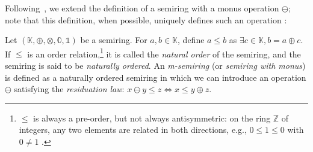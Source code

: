 Following~\cite{geerts2010database}, we extend the definition of a semiring with a monus operation $\ominus$;
note that this definition, when possible, uniquely defines such an
operation :
\begin{definition} \label{def:m-semiring}
  Let $(\mathbb K, \oplus, \otimes, \mathbb 0, \mathbb 1)$ be a semiring.
  For $a, b\in\mathbb K$, define
$a\le b$ as $\exists c\in\mathbb K, {b = a\oplus c}$. If $\leq$ is an order
relation,\footnote{$\leq$ is always a
pre-order, but not always antisymmetric: on the ring $\mathbb Z$ of
integers, any two elements are related in both directions, e.g.,
$0\le 1\le 0$ with $0\neq 1$
.}
it is called
the \emph{natural order} of the semiring, and the semiring is said to be
\emph{naturally ordered}.
An \emph{m-semiring} (or \emph{semiring with monus})
is defined as a naturally ordered semiring in which we can introduce an
operation $\ominus$ satisfying the \emph{residuation law}:
\(
  x\ominus y \le z \iff x \le y\oplus z
  \).
\end{definition}

